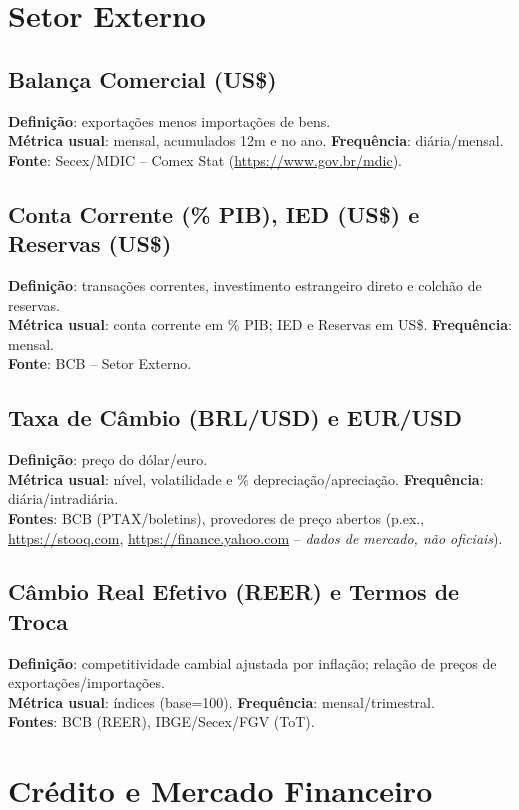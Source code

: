 \documentclass[11pt,a4paper]{article}
\begin{document}
\section{Setor Externo}
\subsection*{Balança Comercial (US\$)}
\textbf{Definição}: exportações menos importações de bens.\\
\textbf{Métrica usual}: mensal, acumulados 12m e no ano. \textbf{Frequência}: diária/mensal.\\
\textbf{Fonte}: Secex/MDIC -- Comex Stat (\url{https://www.gov.br/mdic}).

\subsection*{Conta Corrente (\% PIB), IED (US\$) e Reservas (US\$)}
\textbf{Definição}: transações correntes, investimento estrangeiro direto e colchão de reservas.\\
\textbf{Métrica usual}: conta corrente em \% PIB; IED e Reservas em US\$. \textbf{Frequência}: mensal.\\
\textbf{Fonte}: BCB -- Setor Externo.

\subsection*{Taxa de Câmbio (BRL/USD) e EUR/USD}
\textbf{Definição}: preço do dólar/euro.\\
\textbf{Métrica usual}: nível, volatilidade e \% depreciação/apreciação. \textbf{Frequência}: diária/intradiária.\\
\textbf{Fontes}: BCB (PTAX/boletins), provedores de preço abertos (p.ex., \url{https://stooq.com}, \url{https://finance.yahoo.com} -- \emph{dados de mercado, não oficiais}).

\subsection*{Câmbio Real Efetivo (REER) e Termos de Troca}
\textbf{Definição}: competitividade cambial ajustada por inflação; relação de preços de exportações/importações.\\
\textbf{Métrica usual}: índices (base=100). \textbf{Frequência}: mensal/trimestral.\\
\textbf{Fontes}: BCB (REER), IBGE/Secex/FGV (ToT).

\section{Crédito e Mercado Financeiro}
\end{document}
